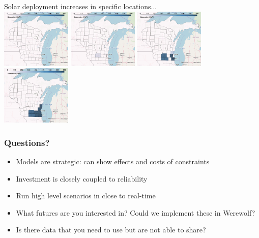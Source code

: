 \documentclass[xcolor=dvipsnames]{beamer}
\begin{document}
\begin{frame}
  Solar deployment increases in specific locations... \\
  \includegraphics[width=0.25\textwidth]{includes/no_leakage_maxNR_solar_r0.png}
  \includegraphics[width=0.25\textwidth]{includes/no_leakage_maxNR_solar_r2.png}
  \includegraphics[width=0.25\textwidth]{includes/no_leakage_maxNR_solar_r3.png}
  \includegraphics[width=0.25\textwidth]{includes/no_leakage_maxNR_solar_r4.png}

\end{frame}

\begin{frame}
  \frametitle{Questions?}
  \begin{itemize}
  \item Models are strategic: can show effects and costs of constraints
  \item Investment is closely coupled to reliability
  \item Run high level scenarios in close to real-time
  \item \alert{What futures are you interested in?}   Could we implement these
    in Werewolf?
  \item Is there data that you need to use but are not able to share?
  \end{itemize}
\end{frame}
%
\appendix
\end{document}
